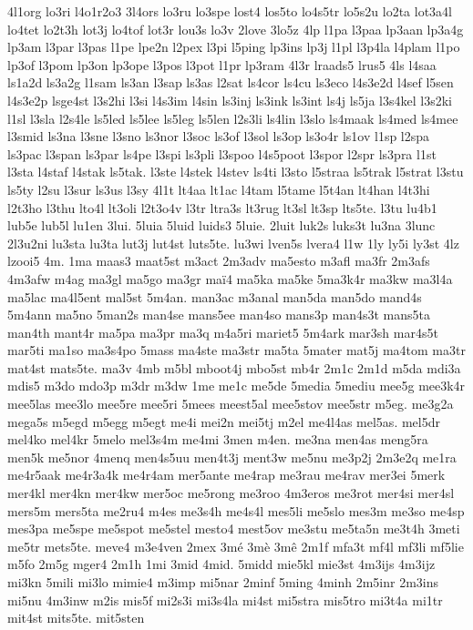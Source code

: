 {4l1org
lo3ri
l4o1r2o3
3l4ors
lo3ru
lo3spe
lost4
los5to
lo4s5tr
lo5s2u
lo2ta
lot3a4l
lo4tet
lo2t3h
lot3j
lo4tof
lot3r
lou3s
lo3v
2love
3lo5z
4lp
l1pa
l3paa
lp3aan
lp3a4g
lp3am
l3par
l3pas
l1pe
lpe2n
l2pex
l3pi
l5ping
lp3ins
lp3j
l1pl
l3p4la
l4plam
l1po
lp3of
l3pom
lp3on
lp3ope
l3pos
l3pot
l1pr
lp3ram
4l3r
lraads5
lrus5
4ls
l4saa
ls1a2d
ls3a2g
l1sam
ls3an
l3sap
ls3as
l2sat
ls4cor
ls4cu
ls3eco
l4s3e2d
l4sef
l5sen
l4s3e2p
lsge4st
l3s2hi
l3si
l4s3im
l4sin
ls3inj
ls3ink
ls3int
ls4j
ls5ja
l3s4kel
l3s2ki
l1sl
l3sla
l2s4le
ls5led
ls5lee
ls5leg
ls5len
l2s3li
ls4lin
l3slo
ls4maak
ls4med
ls4mee
l3smid
ls3na
l3sne
l3sno
ls3nor
l3soc
ls3of
l3sol
ls3op
ls3o4r
ls1ov
l1sp
l2spa
ls3pac
l3span
ls3par
ls4pe
l3spi
ls3pli
l3spoo
l4s5poot
l3spor
l2spr
ls3pra
l1st
l3sta
l4staf
l4stak
ls5tak.
l3ste
l4stek
l4stev
ls4ti
l3sto
l5straa
ls5trak
l5strat
l3stu
ls5ty
l2su
l3sur
ls3us
l3sy
4l1t
lt4aa
lt1ac
l4tam
l5tame
l5t4an
lt4han
l4t3hi
l2t3ho
l3thu
lto4l
lt3oli
l2t3o4v
l3tr
ltra3s
lt3rug
lt3sl
lt3sp
lts5te.
l3tu
lu4b1
lub5e
lub5l
lu1en
3lui.
5luia
5luid
luids3
5luie.
2luit
luk2s
luks3t
lu3na
3lunc
2l3u2ni
lu3sta
lu3ta
lut3j
lut4st
luts5te.
lu3wi
lven5s
lvera4
l1w
1ly
ly5i
ly3st
4lz
lzooi5
4m.
1ma
maas3
maat5st
m3act
2m3adv
ma5esto
m3afl
ma3fr
2m3afs
4m3afw
m4ag
ma3gl
ma5go
ma3gr
maï4
ma5ka
ma5ke
5ma3k4r
ma3kw
ma3l4a
ma5lac
ma4l5ent
mal5st
5m4an.
man3ac
m3anal
man5da
man5do
mand4s
5m4ann
ma5no
5man2s
man4se
mans5ee
man4so
mans3p
man4s3t
mans5ta
man4th
mant4r
ma5pa
ma3pr
ma3q
m4a5ri
mariet5
5m4ark
mar3sh
mar4s5t
mar5ti
ma1so
ma3s4po
5mass
ma4ste
ma3str
ma5ta
5mater
mat5j
ma4tom
ma3tr
mat4st
mats5te.
ma3v
4mb
m5bl
mboot4j
mbo5st
mb4r
2m1c
2m1d
m5da
mdi3a
mdis5
m3do
mdo3p
m3dr
m3dw
1me
me1c
me5de
5media
5mediu
mee5g
mee3k4r
mee5las
mee3lo
mee5re
mee5ri
5mees
meest5al
mee5stov
mee5str
m5eg.
me3g2a
mega5s
m5egd
m5egg
m5egt
me4i
mei2n
mei5tj
m2el
me4l4as
mel5as.
mel5dr
mel4ko
mel4kr
5melo
mel3s4m
me4mi
3men
m4en.
me3na
men4as
meng5ra
men5k
me5nor
4menq
men4s5uu
men4t3j
ment3w
me5nu
me3p2j
2m3e2q
me1ra
me4r5aak
me4r3a4k
me4r4am
mer5ante
me4rap
me3rau
me4rav
mer3ei
5merk
mer4kl
mer4kn
mer4kw
mer5oc
me5rong
me3roo
4m3eros
me3rot
mer4si
mer4sl
mers5m
mers5ta
me2ru4
m4es
me3s4h
me4s4l
mes5li
me5slo
mes3m
me3so
me4sp
mes3pa
me5spe
me5spot
me5stel
mesto4
mest5ov
me3stu
me5ta5n
me3t4h
3meti
me5tr
mets5te.
meve4
m3e4ven
2mex
3mé
3mè
3mê
2m1f
mfa3t
mf4l
mf3li
mf5lie
m5fo
2m5g
mger4
2m1h
1mi
3mid
4mid.
5midd
mie5kl
mie3st
4m3ijs
4m3ijz
mi3kn
5mili
mi3lo
mimie4
m3imp
mi5nar
2minf
5ming
4minh
2m5inr
2m3ins
mi5nu
4m3inw
m2is
mis5f
mi2s3i
mi3s4la
mi4st
mi5stra
mis5tro
mi3t4a
mi1tr
mit4st
mits5te.
mit5sten
}
